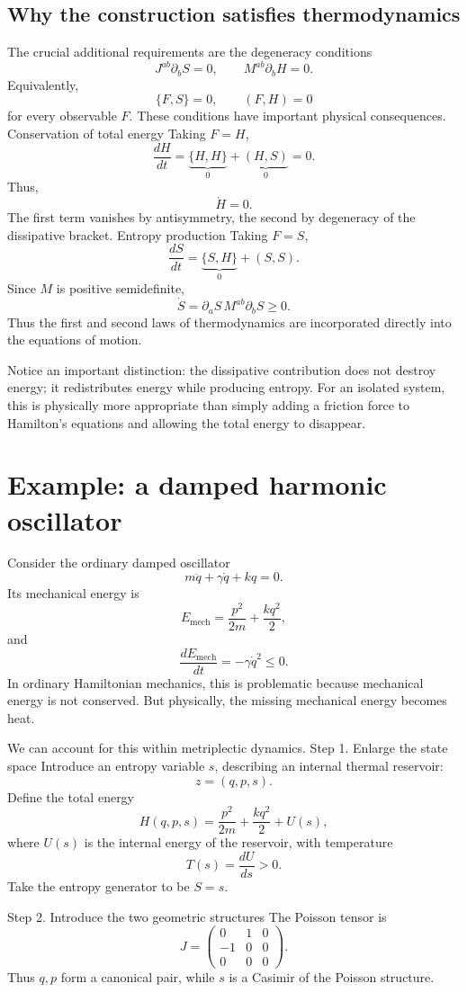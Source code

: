 \subsection{ Why the construction satisfies thermodynamics}
The crucial additional requirements are the degeneracy conditions
\[
\boxed{
J^{ab}\partial_b S=0,
\qquad
M^{ab}\partial_b H=0.
}
\]
Equivalently,
\[
\{F,S\}=0,\qquad (F,H)=0
\]
for every observable \(F\).
These conditions have important physical consequences.
Conservation of total energy
Taking \(F=H\),
\[
\frac{dH}{dt}
=
\underbrace{\{H,H\}}_{0}
+
\underbrace{(H,S)}_{0}
=0.
\]
Thus,
\[
\boxed{\dot H=0.}
\]
The first term vanishes by antisymmetry, the second by degeneracy of the
dissipative bracket.
Entropy production
Taking \(F=S\),
\[
\frac{dS}{dt}
=
\underbrace{\{S,H\}}_{0}
+
(S,S).
\]
Since \(M\) is positive semidefinite,
\[
\boxed{
\dot S
=
\partial_a S\,M^{ab}\partial_b S
\geq0.
}
\]
Thus the first and second laws of thermodynamics are incorporated directly into
the equations of motion.

Notice an important distinction: the dissipative contribution does not destroy
energy; it redistributes energy while producing entropy.
For an isolated system, this is physically more appropriate than simply adding
a friction force to Hamilton's equations and allowing the total energy to
disappear.

\section{Example: a damped harmonic oscillator}
Consider the ordinary damped oscillator
\[
m\ddot q+\gamma\dot q+kq=0.
\]
Its mechanical energy is
\[
E_{\mathrm{mech}}
=\frac{p^2}{2m}+\frac{kq^2}{2},
\]
and
\[
\frac{dE_{\mathrm{mech}}}{dt}
=-\gamma\dot q^2\leq0.
\]
In ordinary Hamiltonian mechanics, this is problematic because mechanical
energy is not conserved.
But physically, the missing mechanical energy becomes heat.

We can account for this within metriplectic dynamics.
Step 1. Enlarge the state space
Introduce an entropy variable \(s\), describing an internal thermal reservoir:
\[
z=(q,p,s).
\]
Define the total energy
\[
\boxed{
H(q,p,s)
=
\frac{p^2}{2m}
+\frac{kq^2}{2}
+U(s),
}
\]
where \(U(s)\) is the internal energy of the reservoir, with temperature
\[
T(s)=\frac{dU}{ds}>0.
\]
Take the entropy generator to be \(S=s\).

Step 2. Introduce the two geometric structures
The Poisson tensor is
\[
J=
\begin{pmatrix}
0&1&0\\
-1&0&0\\
0&0&0
\end{pmatrix}.
\]
Thus \(q,p\) form a canonical pair, while \(s\) is a Casimir of the Poisson
structure.

